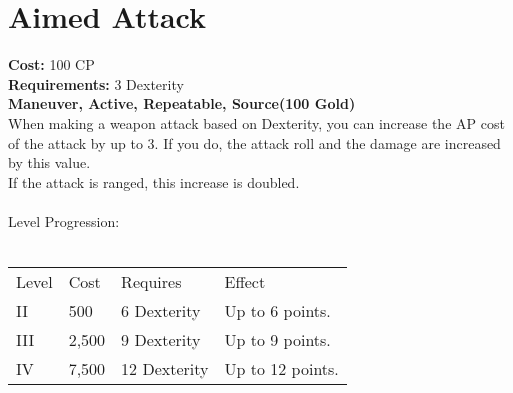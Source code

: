 \section{Aimed Attack}
\textbf{Cost:} 100 CP\\
\textbf{Requirements:} 3 Dexterity\\
\textbf{Maneuver, Active, Repeatable, Source(100 Gold)}\\
When making a weapon attack based on Dexterity, you can increase the AP cost of the attack by up to 3. If you do, the attack roll and the damage are increased by this value.\\
If the attack is ranged, this increase is doubled.\\
\\
Level Progression:\\
\\
\begin{tabular}{l | l | l | l}
	Level & Cost & Requires & Effect\\
	II & 500 & 6 Dexterity & Up to 6 points.\\
	III & 2,500 & 9 Dexterity & Up to 9 points.\\
	IV & 7,500 & 12 Dexterity & Up to 12 points.\\
\end{tabular}
